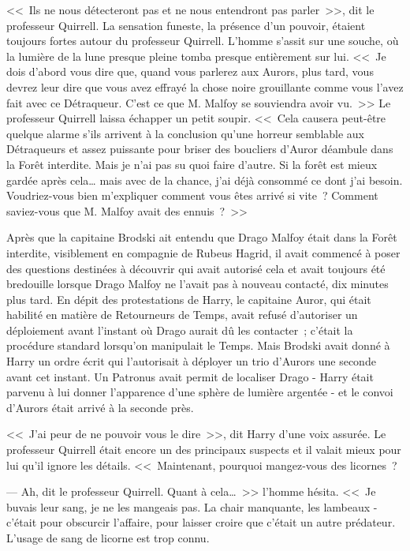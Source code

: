<<~Ils ne nous détecteront pas et ne nous entendront pas parler~>>, dit le professeur Quirrell. La sensation funeste, la présence d'un pouvoir, étaient toujours fortes autour du professeur Quirrell. L'homme s'assit sur une souche, où la lumière de la lune presque pleine tomba presque entièrement sur lui. <<~Je dois d'abord vous dire que, quand vous parlerez aux Aurors, plus tard, vous devrez leur dire que vous avez effrayé la chose noire grouillante comme vous l'avez fait avec ce Détraqueur. C'est ce que M. Malfoy se souviendra avoir vu.~>> Le professeur Quirrell laissa échapper un petit soupir. <<~Cela causera peut-être quelque alarme s'ils arrivent à la conclusion qu'une horreur semblable aux Détraqueurs et assez puissante pour briser des boucliers d'Auror déambule dans la Forêt interdite. Mais je n'ai pas su quoi faire d'autre. Si la forêt est mieux gardée après cela… mais avec de la chance, j'ai déjà consommé ce dont j'ai besoin. Voudriez-vous bien m'expliquer comment vous êtes arrivé si vite~? Comment saviez-vous que M. Malfoy avait des ennuis~?~>>

Après que la capitaine Brodski ait entendu que Drago Malfoy était dans la Forêt interdite, visiblement en compagnie de Rubeus Hagrid, il avait commencé à poser des questions destinées à découvrir qui avait autorisé cela et avait toujours été bredouille lorsque Drago Malfoy ne l'avait pas à nouveau contacté, dix minutes plus tard. En dépit des protestations de Harry, le capitaine Auror, qui était habilité en matière de Retourneurs de Temps, avait refusé d'autoriser un déploiement avant l'instant où Drago aurait dû les contacter~; c'était la procédure standard lorsqu'on manipulait le Temps. Mais Brodski avait donné à Harry un ordre écrit qui l'autorisait à déployer un trio d'Aurors une seconde avant cet instant. Un Patronus avait permit de localiser Drago - Harry était parvenu à lui donner l'apparence d'une sphère de lumière argentée - et le convoi d'Aurors était arrivé à la seconde près.

<<~J'ai peur de ne pouvoir vous le dire~>>, dit Harry d'une voix assurée. Le professeur Quirrell était encore un des principaux suspects et il valait mieux pour lui qu'il ignore les détails. <<~Maintenant, pourquoi mangez-vous des licornes~?

--- Ah, dit le professeur Quirrell. Quant à cela…~>> l'homme hésita. <<~Je buvais leur sang, je ne les mangeais pas. La chair manquante, les lambeaux - c'était pour obscurcir l'affaire, pour laisser croire que c'était un autre prédateur. L'usage de sang de licorne est trop connu.

